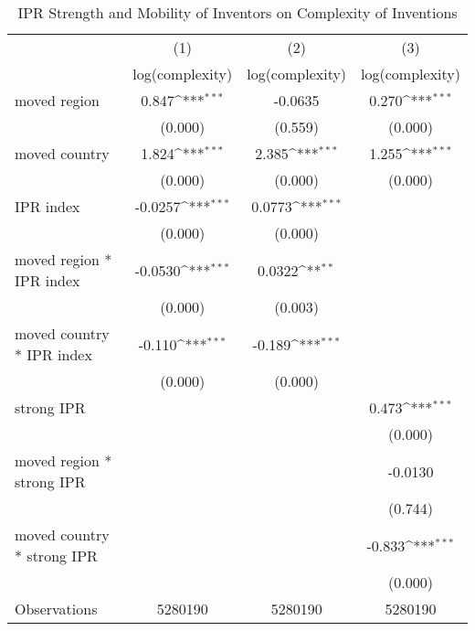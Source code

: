 {
\def\sym#1{\ifmmode^{#1}\else\(^{#1}\)\fi}
\begin{longtable}{l*{3}{c}}
\caption{IPR Strength and Mobility of Inventors on Complexity of Inventions \label{model2a2b2c}}\\
\hline\hline\endfirsthead\hline\endhead\hline\endfoot\endlastfoot
                &\multicolumn{1}{c}{(1)}&\multicolumn{1}{c}{(2)}&\multicolumn{1}{c}{(3)}\\
                &\multicolumn{1}{c}{log(complexity)}&\multicolumn{1}{c}{log(complexity)}&\multicolumn{1}{c}{log(complexity)}\\
\hline
moved region    &    0.847\sym{***}&  -0.0635         &    0.270\sym{***}\\
                &  (0.000)         &  (0.559)         &  (0.000)         \\
moved country   &    1.824\sym{***}&    2.385\sym{***}&    1.255\sym{***}\\
                &  (0.000)         &  (0.000)         &  (0.000)         \\
IPR index       &  -0.0257\sym{***}&   0.0773\sym{***}&                  \\
                &  (0.000)         &  (0.000)         &                  \\
moved region * IPR index&  -0.0530\sym{***}&   0.0322\sym{**} &                  \\
                &  (0.000)         &  (0.003)         &                  \\
moved country * IPR index&   -0.110\sym{***}&   -0.189\sym{***}&                  \\
                &  (0.000)         &  (0.000)         &                  \\
strong IPR      &                  &                  &    0.473\sym{***}\\
                &                  &                  &  (0.000)         \\
moved region * strong IPR&                  &                  &  -0.0130         \\
                &                  &                  &  (0.744)         \\
moved country * strong IPR&                  &                  &   -0.833\sym{***}\\
                &                  &                  &  (0.000)         \\
\hline
Observations    &  5280190         &  5280190         &  5280190         \\

\end{longtable}}
